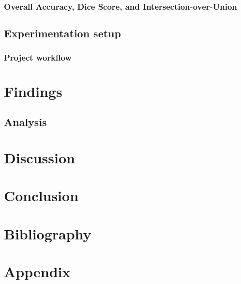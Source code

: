 \documentclass[11pt, a4paper, twoside]{report}
\begin{document}
\subsection{Overall Accuracy, Dice Score, and Intersection-over-Union}\label{2ndorder}
\section{Experimentation setup}\label{ExpSetup}
\subsection{Project workflow}\label{ProjWorkflow}

\newpage

\chapter{Findings}\label{findings}
\section{Analysis}\label{analysis}

\newpage

\chapter{Discussion}\label{Discuss}

\newpage

\chapter{Conclusion}\label{Conclude}

\newpage

\chapter{Bibliography}\label{Bib}

\newpage

\appendix

\chapter{Appendix}\label{Appen}
\end{document}
